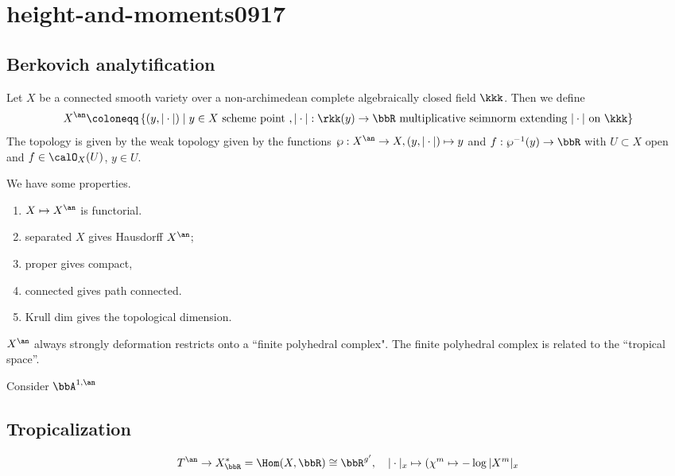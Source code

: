 \section{height-and-moments0917}


\subsection[status=draft,tag=0000000,label=\labelNFM{subsec:berk}]{Berkovich analytification}

Let $X$ be a connected smooth variety over a non-archimedean complete algebraically closed  field $\kkk$.
Then we define
\[ X^\an \coloneqq \left\{ (y,|\cdot| ) \;\middle|\; y \in X \text{ scheme point }, |\cdot|: \rkk(y) \to \bbR \text{ multiplicative seimnorm extending } |\cdot| \text{ on } \kkk   \right\} \]
The topology is given by the weak topology given by the functions $\wp: X^\an \to X, (y,|\cdot|) \mapsto y$ and $f: \wp^{-1}(y) \to \bbR$ with $U \subset X$ open and $f \in \calO_X(U)$, $y \in U$.

We have some properties.
\begin{enumerate}
	\item $X \mapsto X^\an$ is functorial.
	\item separated $X$ gives Hausdorff $X^\an$;
	\item proper gives compact,
	\item connected gives path connected.
	\item Krull dim gives the topological dimension.
\end{enumerate}

\begin{theorem}[label=\labelNFM{thm:thm1}, status=draft, tag=0000000]
	$X^\an$ always strongly deformation restricts onto a ``finite polyhedral complex".
	The finite polyhedral complex is related to the ``tropical space''.
\end{theorem}

\begin{example}[label=\labelNFM{eg:1}, status=draft, tag=0000000]
	Consider $\bbA^{1,\an}$
\end{example}

\begin{example}[label=\labelNFM{eg:2}, status=draft, tag=0000000]

\end{example}


\subsection[status=draft,tag=0000000,label=\labelNFM{subsec:tropicalization}]{Tropicalization}

\[ T^\an \to X_\bbR^* = \Hom(X,\bbR) \cong \bbR^{g'}, \quad |\cdot|_x \mapsto (\chi^m \mapsto - \log |X^m|_x \]















